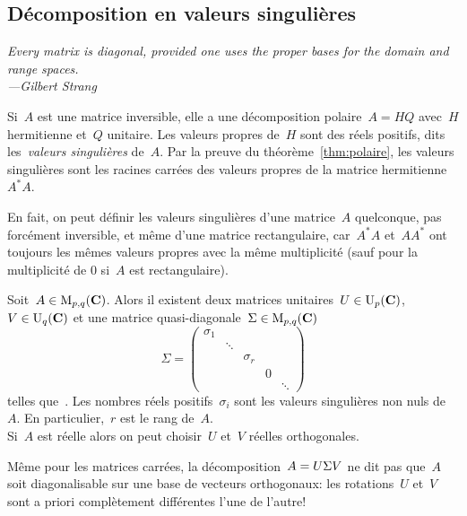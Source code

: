 \subsection{Décomposition en valeurs singulières}

\emph{\small Every matrix is diagonal, provided one uses the proper bases for
the domain and range spaces.\\ \hfill---Gilbert Strang}

Si~$A$ est une matrice inversible, elle a une décomposition
polaire~$A=HQ$ avec~$H$ hermitienne et~$Q$ unitaire.  Les valeurs propres
de~$H$ sont des réels positifs, dits les~\emph{valeurs singulières} de~$A$.
Par la preuve du théorème~\ref{thm:polaire}, les valeurs singulières sont les
racines carrées des valeurs propres de la matrice hermitienne~$A^*A$.

En fait, on peut définir les valeurs singulières d'une matrice~$A$
quelconque, pas forcément inversible, et même d'une matrice rectangulaire,
car~$A^*A$ et~$AA^*$ ont toujours les mêmes valeurs propres avec la même
multiplicité (sauf pour la multiplicité de $0$ si~$A$ est rectangulaire).

\begin{theorem}
	Soit~$A\in\mathrm{M}_{p,q}(\mathbf{C})$.  Alors il existent deux matrices unitaires~$U\in
	\mathrm{U}_p(\mathbf{C})$, $V\in\mathrm{U}_q(\mathbf{C})$ et une matrice quasi-diagonale~$\Sigma\in
	\mathrm{M}_{p,q}(\mathbf{C})$
	\[
		\Sigma = \begin{pmatrix}
			\sigma_1 & & & & \\
			 & \ddots & & & \\
			 & & \sigma_r & & \\
			 & & & 0 & \\
			 & & & & \ddots
		\end{pmatrix}
	\]
	telles que~.  Les nombres réels
	positifs~$\sigma_i$ sont les valeurs singulières non nuls de~$A$.  En
	particulier,~$r$ est le rang de~$A$. \\
	Si~$A$ est réelle alors on peut choisir~$U$ et~$V$ réelles orthogonales.
\end{theorem}

\begin{remark}
	Même pour les matrices carrées, la décomposition~$A=U\/\Sigma V$ ne dit pas
	que~$A$ soit diagonalisable sur une base de vecteurs orthogonaux: les
	rotations~$U$ et~$V$ sont a priori complètement différentes l'une de l'autre!
\end{remark}

